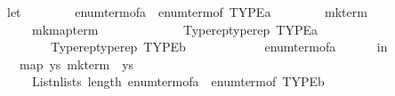 \begin{isabellebody}
\ \ \ \ \ \ let\isanewline
\ \ \ \ \ \ \ \ enum{\isacharunderscore}{\kern0pt}term{\isacharunderscore}{\kern0pt}of{\isacharunderscore}{\kern0pt}a\ {\isacharequal}{\kern0pt}\ enum{\isacharunderscore}{\kern0pt}term{\isacharunderscore}{\kern0pt}of\ {\isacharparenleft}{\kern0pt}TYPE{\isacharparenleft}{\kern0pt}{\isacharprime}{\kern0pt}a{\isacharparenright}{\kern0pt}{\isacharparenright}{\kern0pt}{\isacharsemicolon}{\kern0pt}\isanewline
\ \ \ \ \ \ \ \ mk{\isacharunderscore}{\kern0pt}term\ {\isacharequal}{\kern0pt}\isanewline
\ \ \ \ \ \ \ \ \ \ mk{\isacharunderscore}{\kern0pt}map{\isacharunderscore}{\kern0pt}term\isanewline
\ \ \ \ \ \ \ \ \ \ \ \ {\isacharparenleft}{\kern0pt}{\isasymlambda}{\isacharunderscore}{\kern0pt}{\isachardot}{\kern0pt}\ Typerep{\isachardot}{\kern0pt}typerep\ {\isacharparenleft}{\kern0pt}TYPE{\isacharparenleft}{\kern0pt}{\isacharprime}{\kern0pt}a{\isacharparenright}{\kern0pt}{\isacharparenright}{\kern0pt}{\isacharparenright}{\kern0pt}\isanewline
\ \ \ \ \ \ \ \ \ \ \ \ {\isacharparenleft}{\kern0pt}{\isasymlambda}{\isacharunderscore}{\kern0pt}{\isachardot}{\kern0pt}\ Typerep{\isachardot}{\kern0pt}typerep\ {\isacharparenleft}{\kern0pt}TYPE{\isacharparenleft}{\kern0pt}{\isacharprime}{\kern0pt}b{\isacharparenright}{\kern0pt}{\isacharparenright}{\kern0pt}{\isacharparenright}{\kern0pt}\isanewline
\ \ \ \ \ \ \ \ \ \ \ \ enum{\isacharunderscore}{\kern0pt}term{\isacharunderscore}{\kern0pt}of{\isacharunderscore}{\kern0pt}a\isanewline
\ \ \ \ \ \ in\isanewline
\ \ \ \ \ \ \ \ map\ {\isacharparenleft}{\kern0pt}{\isasymlambda}ys{\isachardot}{\kern0pt}\ mk{\isacharunderscore}{\kern0pt}term\ {\isacharparenleft}{\kern0pt}{\isasymlambda}{\isacharunderscore}{\kern0pt}{\isachardot}{\kern0pt}\ ys{\isacharparenright}{\kern0pt}\ {\isacharparenleft}{\kern0pt}{\isacharparenright}{\kern0pt}{\isacharparenright}{\kern0pt}\isanewline
\ \ \ \ \ \ \ \ \ \ {\isacharparenleft}{\kern0pt}List{\isachardot}{\kern0pt}n{\isacharunderscore}{\kern0pt}lists\ {\isacharparenleft}{\kern0pt}length\ {\isacharparenleft}{\kern0pt}enum{\isacharunderscore}{\kern0pt}term{\isacharunderscore}{\kern0pt}of{\isacharunderscore}{\kern0pt}a\ {\isacharparenleft}{\kern0pt}{\isacharparenright}{\kern0pt}{\isacharparenright}{\kern0pt}{\isacharparenright}{\kern0pt}\ {\isacharparenleft}{\kern0pt}enum{\isacharunderscore}{\kern0pt}term{\isacharunderscore}{\kern0pt}of\ {\isacharparenleft}{\kern0pt}TYPE{\isacharparenleft}{\kern0pt}{\isacharprime}{\kern0pt}b{\isacharparenright}{\kern0pt}{\isacharparenright}{\kern0pt}\ {\isacharparenleft}{\kern0pt}{\isacharparenright}{\kern0pt}{\isacharparenright}{\kern0pt}{\isacharparenright}{\kern0pt}{\isacharparenright}{\kern0pt}{\isachardoublequoteclose}\isanewline

\end{isabellebody}
